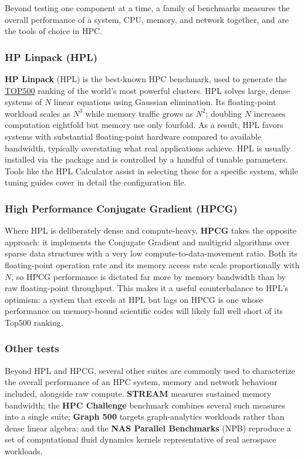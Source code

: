 Beyond testing one component at a time, a family of benchmarks measures the overall performance of a system, CPU, memory, and network together, and are the tools of choice in HPC.

\subsubsection{HP Linpack (HPL)}

\textbf{HP Linpack} (HPL) is the best-known HPC benchmark, used to generate the \href{https://www.top500.org}{TOP500} ranking of the world's most powerful clusters. HPL solves large, dense systems of $N$ linear equations using Gaussian elimination. Its floating-point workload scales as $N^3$ while memory traffic grows as $N^2$; doubling $N$ increases computation eightfold but memory use only fourfold. As a result, HPL favors systems with substantial floating-point hardware compared to available bandwidth, typically overstating what real applications achieve. HPL is usually installed via the  package and is controlled by a handful of tunable parameters. Tools like the HPL Calculator assist in selecting these for a specific system, while tuning guides cover in detail the  configuration file.

\subsubsection{High Performance Conjugate Gradient (HPCG)}

Where HPL is deliberately dense and compute-heavy, \textbf{HPCG} takes the opposite approach: it implements the Conjugate Gradient and multigrid algorithms over sparse data structures with a very low compute-to-data-movement ratio. Both its floating-point operation rate and its memory access rate scale proportionally with $N$, so HPCG performance is dictated far more by memory bandwidth than by raw floating-point throughput. This makes it a useful counterbalance to HPL's optimism: a system that excels at HPL but lags on HPCG is one whose performance on memory-bound scientific codes will likely fall well short of its Top500 ranking.

\subsubsection{Other tests}

Beyond HPL and HPCG, several other suites are commonly used to characterize the overall performance of an HPC system, memory and network behaviour included, alongside raw compute. \textbf{STREAM} measures sustained memory bandwidth; the \textbf{HPC Challenge} benchmark combines several such measures into a single suite; \textbf{Graph 500} targets graph-analytics workloads rather than dense linear algebra; and the \textbf{NAS Parallel Benchmarks} (NPB) reproduce a set of computational fluid dynamics kernels representative of real aerospace workloads.

